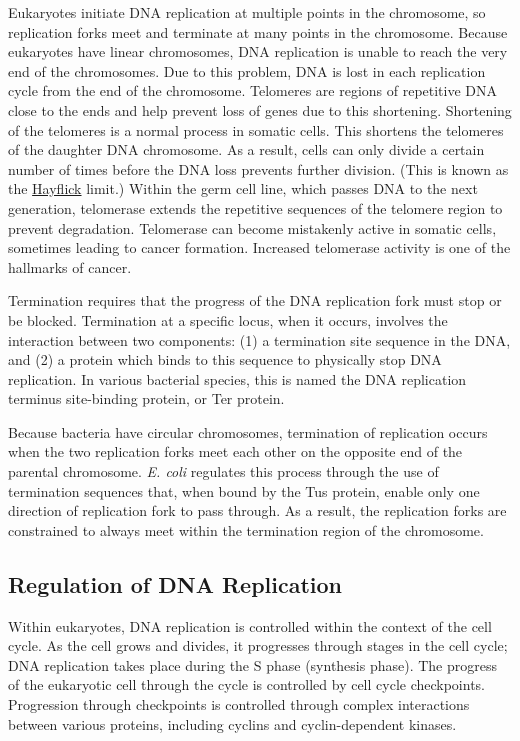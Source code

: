 Eukaryotes initiate DNA replication at multiple points in the chromosome, so replication forks meet and terminate at many points in the chromosome. Because eukaryotes have linear chromosomes, DNA replication is unable to reach the very end of the chromosomes. Due to this problem, DNA is lost in each replication cycle from the end of the chromosome. Telomeres are regions of repetitive DNA close to the ends and help prevent loss of genes due to this shortening. Shortening of the telomeres is a normal process in somatic cells. This shortens the telomeres of the daughter DNA chromosome. As a result, cells can only divide a certain number of times before the DNA loss prevents further division. (This is known as the \href{https://en.wikipedia.org/wiki/Leonard_Hayflick}{Hayflick} limit.) Within the germ cell line, which passes DNA to the next generation, telomerase extends the repetitive sequences of the telomere region to prevent degradation. Telomerase can become mistakenly active in somatic cells, sometimes leading to cancer formation. Increased telomerase activity is one of the hallmarks of cancer.

Termination requires that the progress of the DNA replication fork must stop or be blocked. Termination at a specific locus, when it occurs, involves the interaction between two components: (1) a termination site sequence in the DNA, and (2) a protein which binds to this sequence to physically stop DNA replication. In various bacterial species, this is named the DNA replication terminus site-binding protein, or Ter protein.

Because bacteria have circular chromosomes, termination of replication occurs when the two replication forks meet each other on the opposite end of the parental chromosome. \emph{E. coli} regulates this process through the use of termination sequences that, when bound by the Tus protein, enable only one direction of replication fork to pass through. As a result, the replication forks are constrained to always meet within the termination region of the chromosome.

\hypertarget{regulation-of-dna-replication}{%
\subsection{Regulation of DNA Replication}\label{regulation-of-dna-replication}}

Within eukaryotes, DNA replication is controlled within the context of the cell cycle. As the cell grows and divides, it progresses through stages in the cell cycle; DNA replication takes place during the S phase (synthesis phase). The progress of the eukaryotic cell through the cycle is controlled by cell cycle checkpoints. Progression through checkpoints is controlled through complex interactions between various proteins, including cyclins and cyclin-dependent kinases.

